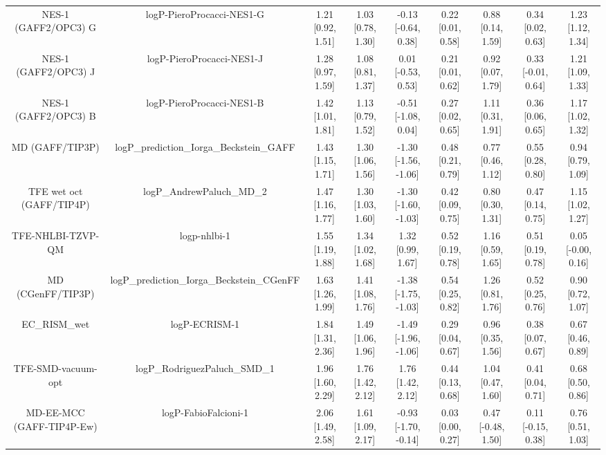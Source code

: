 \documentclass{article}
\begin{document}
\begin{center}
\begin{longtable}{|ccccccccc|}
         NES-1 (GAFF2/OPC3) G &                      logP-PieroProcacci-NES1-G &  1.21 [0.92, 1.51] &  1.03 [0.78, 1.30] &   -0.13 [-0.64, 0.38] &  0.22 [0.01, 0.58] &     0.88 [0.14, 1.59] &     0.34 [0.02, 0.63] &     1.23 [1.12, 1.34] \\
         NES-1 (GAFF2/OPC3) J &                      logP-PieroProcacci-NES1-J &  1.28 [0.97, 1.59] &  1.08 [0.81, 1.37] &    0.01 [-0.53, 0.53] &  0.21 [0.01, 0.62] &     0.92 [0.07, 1.79] &    0.33 [-0.01, 0.64] &     1.21 [1.09, 1.33] \\
         NES-1 (GAFF2/OPC3) B &                      logP-PieroProcacci-NES1-B &  1.42 [1.01, 1.81] &  1.13 [0.79, 1.52] &   -0.51 [-1.08, 0.04] &  0.27 [0.02, 0.65] &     1.11 [0.31, 1.91] &     0.36 [0.06, 0.65] &     1.17 [1.02, 1.32] \\
              MD (GAFF/TIP3P) &       logP\_prediction\_Iorga\_Beckstein\_GAFF &  1.43 [1.15, 1.71] &  1.30 [1.06, 1.56] &  -1.30 [-1.56, -1.06] &  0.48 [0.21, 0.79] &     0.77 [0.46, 1.12] &     0.55 [0.28, 0.80] &     0.94 [0.79, 1.09] \\
     TFE wet oct (GAFF/TIP4P) &                      logP\_AndrewPaluch\_MD\_2 &  1.47 [1.16, 1.77] &  1.30 [1.03, 1.60] &  -1.30 [-1.60, -1.03] &  0.42 [0.09, 0.75] &     0.80 [0.30, 1.31] &     0.47 [0.14, 0.75] &     1.15 [1.02, 1.27] \\
            TFE-NHLBI-TZVP-QM &                                   logp-nhlbi-1 &  1.55 [1.19, 1.88] &  1.34 [1.02, 1.68] &     1.32 [0.99, 1.67] &  0.52 [0.19, 0.78] &     1.16 [0.59, 1.65] &     0.51 [0.19, 0.78] &    0.05 [-0.00, 0.16] \\
            MD (CGenFF/TIP3P) &     logP\_prediction\_Iorga\_Beckstein\_CGenFF &  1.63 [1.26, 1.99] &  1.41 [1.08, 1.76] &  -1.38 [-1.75, -1.03] &  0.54 [0.25, 0.82] &     1.26 [0.81, 1.76] &     0.52 [0.25, 0.76] &     0.90 [0.72, 1.07] \\
                  EC_RISM_wet &                                  logP-ECRISM-1 &  1.84 [1.31, 2.36] &  1.49 [1.06, 1.96] &  -1.49 [-1.96, -1.06] &  0.29 [0.04, 0.67] &     0.96 [0.35, 1.56] &     0.38 [0.07, 0.67] &     0.67 [0.46, 0.89] \\
           TFE-SMD-vacuum-opt &                  logP\_RodriguezPaluch\_SMD\_1 &  1.96 [1.60, 2.29] &  1.76 [1.42, 2.12] &     1.76 [1.42, 2.12] &  0.44 [0.13, 0.68] &     1.04 [0.47, 1.60] &     0.41 [0.04, 0.71] &     0.68 [0.50, 0.86] \\
    MD-EE-MCC (GAFF-TIP4P-Ew) &                           logP-FabioFalcioni-1 &  2.06 [1.49, 2.58] &  1.61 [1.09, 2.17] &  -0.93 [-1.70, -0.14] &  0.03 [0.00, 0.27] &    0.47 [-0.48, 1.50] &    0.11 [-0.15, 0.38] &     0.76 [0.51, 1.03] \\

\end{longtable}
\end{center}
\end{document}
